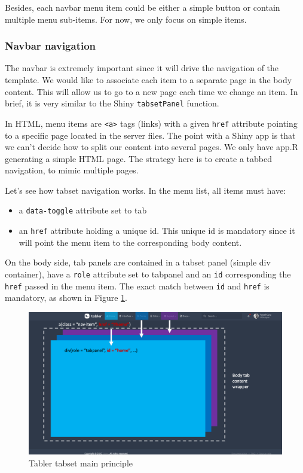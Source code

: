 \documentclass[
]{book}
\providecommand{\tightlist}{%
  \setlength{\itemsep}{0pt}\setlength{\parskip}{0pt}}
\begin{document}
Besides, each navbar menu item could be either a simple button or contain multiple menu sub-items. For now, we only focus on simple items.

\hypertarget{navbar-navigation}{%
\subsubsection{Navbar navigation}\label{navbar-navigation}}

The navbar is extremely important since it will drive the navigation of the template. We would like to associate each item to a separate page in the body content. This will allow us to go to a new page each time we change an item. In brief, it is very similar to the Shiny \texttt{tabsetPanel} function.

In HTML, menu items are \texttt{\textless{}a\textgreater{}} tags (links) with a given \texttt{href} attribute pointing to a specific page located in the server files. The point with a Shiny app is that we can't decide how to split our content into several pages. We only have app.R generating a simple HTML page. The strategy here is to create a tabbed navigation, to mimic multiple pages.

Let's see how tabset navigation works. In the menu list, all items must have:

\begin{itemize}
\tightlist
\item
  a \texttt{data-toggle} attribute set to tab
\item
  an \texttt{href} attribute holding a unique id. This unique id is mandatory since it will point the menu item to the corresponding body content.
\end{itemize}

On the body side, tab panels are contained in a tabset panel (simple div container), have a \texttt{role} attribute set to tabpanel and an \texttt{id} corresponding the \texttt{href} passed in the menu item. The exact match between \texttt{id} and \texttt{href} is mandatory, as shown in Figure \ref{fig:tabler-tabset}.

\begin{figure}
\includegraphics[width=20in]{images/practice/tabler-tabset} \caption{Tabler tabset main principle}\label{fig:tabler-tabset}
\end{figure}
\end{document}
